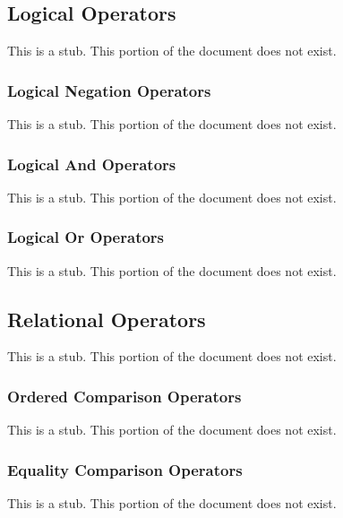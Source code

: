 \subsection{Logical Operators}
\label{Logical_Operators}

This is a stub.  This portion of the document does not exist.

\subsubsection{Logical Negation Operators}
\label{Logical_Negation_Operators}

This is a stub.  This portion of the document does not exist.

\subsubsection{Logical And Operators}
\label{Logical_And_Operators}

This is a stub.  This portion of the document does not exist.

\subsubsection{Logical Or Operators}
\label{Logical_Or_Operators}

This is a stub.  This portion of the document does not exist.

\subsection{Relational Operators}
\label{Relational_Operators}

This is a stub.  This portion of the document does not exist.

\subsubsection{Ordered Comparison Operators}
\label{Ordered_Comparison_Operators}

This is a stub.  This portion of the document does not exist.

\subsubsection{Equality Comparison Operators}
\label{Equality_Comparison_Operators}

This is a stub.  This portion of the document does not exist.

